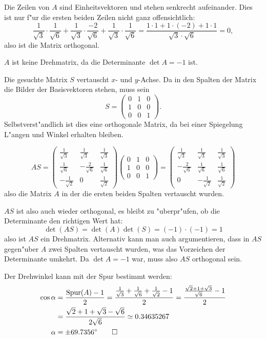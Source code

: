 \begin{loesung}
\begin{teilaufgaben}
\item Die Zeilen von $A$ sind Einheitsvektoren und stehen
senkrecht aufeinander. Dies ist nur f"ur die ersten beiden
Zeilen nicht ganz offensichtlich:
\[
\frac1{\sqrt{3}}\cdot\frac1{\sqrt{6}}
+
\frac1{\sqrt{3}}\cdot\frac{-2}{\sqrt{6}}
+
\frac1{\sqrt{3}}\cdot\frac1{\sqrt{6}}
=\frac{1\cdot 1+1\cdot(-2)+1\cdot 1}{\sqrt{3}\cdot\sqrt{6}}=0,
\]
also ist die Matrix orthogonal.
\item $A$ ist keine Drehmatrix, da die Determinante
$\det A=-1$ ist.
\item Die gesuchte Matrix $S$ vertauscht $x$- und $y$-Achse. Da in den
Spalten der Matrix die Bilder der Basisvektoren stehen, muss sein
\[
S=\begin{pmatrix}0&1&0\\1&0&0\\0&0&1\end{pmatrix}.
\]
Selbstverst"andlich ist dies eine orthogonale Matrix, da bei einer
Spiegelung L"angen und Winkel erhalten bleiben.
\item
\[
AS=
\begin{pmatrix}
\frac1{\sqrt{3}}&\frac1{\sqrt{3}}&\frac1{\sqrt{3}}\\
\frac1{\sqrt{6}}&-\frac2{\sqrt{6}}&\frac1{\sqrt{6}}\\
-\frac1{\sqrt{2}}&0&\frac1{\sqrt{2}}
\end{pmatrix}
\begin{pmatrix}0&1&0\\1&0&0\\0&0&1\end{pmatrix}
=\begin{pmatrix}
\frac1{\sqrt{3}}&\frac1{\sqrt{3}}&\frac1{\sqrt{3}}\\
-\frac2{\sqrt{6}}&\frac1{\sqrt{6}}&\frac1{\sqrt{6}}\\
0&-\frac1{\sqrt{2}}&\frac1{\sqrt{2}}
\end{pmatrix}
\]
also die Matrix $A$ in der die ersten beiden Spalten vertauscht
wurden.
\item
$AS$ ist also auch wieder orthogonal, es bleibt zu "uberpr"ufen,
ob die Determinante den richtigen Wert hat:
\[
\det(AS)=\det(A)\det(S)=(-1)\cdot(-1)=1
\]
also ist $AS$ ein Drehmatrix. Alternativ kann man auch argumentieren,
dass in $AS$ gegen"uber $A$ zwei Spalten vertauscht wurden, was das
Vorzeichen der Determinante umkehrt. Da $\det A=-1$ war, muss also
$AS$ orthogonal sein.
\item
Der Drehwinkel kann mit der Spur bestimmt
werden:
\begin{align*}
\cos \alpha&=\frac{\operatorname{Spur}(A)-1}2=\frac{\frac1{\sqrt{3}}+\frac1{\sqrt{6}}+\frac1{\sqrt{2}}-1}2
=\frac{\frac{\sqrt{2}+1+\sqrt{3}}{\sqrt{6}}-1}2
\\
&=\frac{\sqrt{2}+1+\sqrt{3}-\sqrt{6}}{2\sqrt{6}}\simeq  0.34635267
\\
\alpha&=\pm 69.7356^\circ
\qedhere
\end{align*}
\end{teilaufgaben}
\end{loesung}

